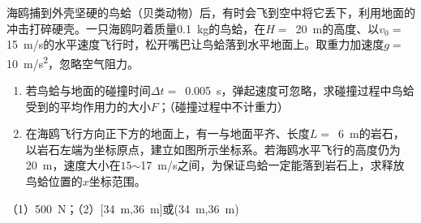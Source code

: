 海鸥捕到外壳坚硬的鸟蛤（贝类动物）后，有时会飞到空中将它丢下，利用地面的冲击打碎硬壳。一只海鸥叼着质量\qty{0.1}{kg}的鸟蛤，在\(H =\) \,\qty{20}{m}的高度、以\(v_0 =\) \,\qty{15}{m/s}的水平速度飞行时，松开嘴巴让鸟蛤落到水平地面上。取重力加速度\(g =\) \,\qty{10}{m/s^2}，忽略空气阻力。
\begin{enumerate}
	\item 若鸟蛤与地面的碰撞时间\(\Delta t =\) \,\qty{0.005}{s}，弹起速度可忽略，求碰撞过程中鸟蛤受到的平均作用力的大小\(F\)；（碰撞过程中不计重力）
	\item 在海鸥飞行方向正下方的地面上，有一与地面平齐、长度\(L =\) \,\qty{6}{m}的岩石，以岩石左端为坐标原点，建立如图所示坐标系。若海鸥水平飞行的高度仍为\qty{20}{m}，速度大小在\(15\)\(\sim\)\qty{17}{m/s}之间，为保证鸟蛤一定能落到岩石上，求释放鸟蛤位置的\(x\)坐标范围。
\end{enumerate}
\begin{answer}
	（1）\qty{500}{N}；（2）[\qty{34}{m},\qty{36}{m}]或(\qty{34}{m},\qty{36}{m})
\end{answer}